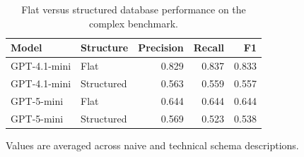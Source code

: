 \begin{table}[htbp]
\centering
\small
\caption{Flat versus structured database performance on the complex benchmark.}
\label{tab:database-structure-complex}
\begin{tabular}{llrrr}
\toprule
Model & Structure & Precision & Recall & F1 \\
\midrule
GPT-4.1-mini & Flat & 0.829 & 0.837 & 0.833 \\
GPT-4.1-mini & Structured & 0.563 & 0.559 & 0.557 \\
GPT-5-mini & Flat & 0.644 & 0.644 & 0.644 \\
GPT-5-mini & Structured & 0.569 & 0.523 & 0.538 \\
\bottomrule
\end{tabular}
\par\footnotesize{Values are averaged across naive and technical schema descriptions.}
\end{table}
